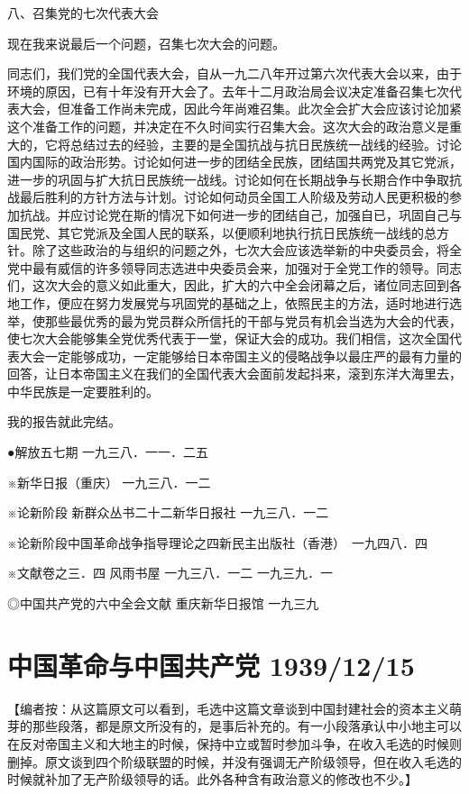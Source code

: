 \documentclass[UTF8, 12pt, a4paper]{ctexrep}
\begin{document}
八、召集党的七次代表大会

现在我来说最后一个问题，召集七次大会的问题。

同志们，我们党的全国代表大会，自从一九二八年开过第六次代表大会以来，由于环境的原因，已有十年没有开大会了。去年十二月政治局会议决定准备召集七次代表大会，但准备工作尚未完成，因此今年尚难召集。此次全会扩大会应该讨论加紧这个准备工作的问题，并决定在不久时间实行召集大会。这次大会的政治意义是重大的，它将总结过去的经验，主要的是全国抗战与抗日民族统一战线的经验。讨论国内国际的政治形势。讨论如何进一步的团结全民族，团结国共两党及其它党派，进一步的巩固与扩大抗日民族统一战线。讨论如何在长期战争与长期合作中争取抗战最后胜利的方针方法与计划。讨论如何动员全国工人阶级及劳动人民更积极的参加抗战。并应讨论党在斯的情况下如何进一步的团结自己，加强自已，巩固自己与国民党、其它党派及全国人民的联系，以便顺利地执行抗日民族统一战线的总方针。除了这些政治的与组织的问题之外，七次大会应该选举新的中央委员会，将全党中最有威信的许多领导同志选进中央委员会来，加强对于全党工作的领导。同志们，这次大会的意义如此重大，因此，扩大的六中全会闭幕之后，诸位同志回到各地工作，便应在努力发展党与巩固党的基础之上，依照民主的方法，适时地进行选举，使那些最优秀的最为党员群众所信托的干部与党员有机会当选为大会的代表，使七次大会能够集全党优秀代表于一堂，保证大会的成功。我们相信，这次全国代表大会一定能够成功，一定能够给日本帝国主义的侵略战争以最庄严的最有力量的回答，让日本帝国主义在我们的全国代表大会面前发起抖来，滚到东洋大海里去，中华民族是一定要胜利的。

我的报告就此完结。

●解放五七期 一九三八．一一．二五

※新华日报（重庆） 一九三八．一二

※论新阶段 新群众丛书二十二新华日报社 一九三八．一二

※论新阶段中国革命战争指导理论之四新民主出版社（香港）　一九四八．四

※文献卷之三．四 风雨书屋 一九三八．一二 一九三九．一

◎中国共产党的六中全会文献 重庆新华日报馆 一九三九

\section{中国革命与中国共产党 1939/12/15}

【编者按：从这篇原文可以看到，毛选中这篇文章谈到中国封建社会的资本主义萌芽的那些段落，都是原文所没有的，是事后补充的。有一小段落承认中小地主可以在反对帝国主义和大地主的时候，保持中立或暂时参加斗争，在收入毛选的时候则删掉。原文谈到四个阶级联盟的时候，并没有强调无产阶级领导，但在收入毛选的时候就补加了无产阶级领导的话。此外各种含有政治意义的修改也不少。】
\end{document}
